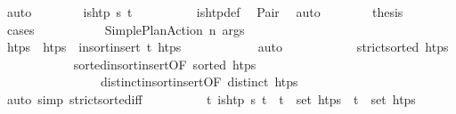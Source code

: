 \begin{isabellebody}
\ auto\isanewline
\ \ \ \ \ \ \isamarkupfalse%
\ {\isachardoublequoteopen}is{\isacharunderscore}{\kern0pt}htp\ {\isacharparenleft}{\kern0pt}{\isasympi}{\isacharhash}{\kern0pt}{\isasympi}s{\isacharparenright}{\kern0pt}\ t\isactrlsub {\isasympi}{\isachardoublequoteclose}\isanewline
\ \ \ \ \ \ \ \ \isamarkupfalse%
\ is{\isacharunderscore}{\kern0pt}htp{\isacharunderscore}{\kern0pt}def\ \isamarkupfalse%
\ Pair\ \isamarkupfalse%
\ auto\isanewline
\ \ \ \ \ \ \isamarkupfalse%
\ {\isacharquery}{\kern0pt}thesis\isanewline
\ \ \ \ \ \ \isamarkupfalse%
\ {\isacharparenleft}{\kern0pt}cases\ {\isasympi}{\isacharprime}{\kern0pt}{\isacharparenright}{\kern0pt}\isanewline
\ \ \ \ \ \ \ \ \isamarkupfalse%
\ {\isacharparenleft}{\kern0pt}Simple{\isacharunderscore}{\kern0pt}Plan{\isacharunderscore}{\kern0pt}Action\ n\ args{\isacharparenright}{\kern0pt}\isanewline
\ \ \ \ \ \ \ \ \isamarkupfalse%
\ \isamarkupfalse%
\ htps\ \ {\isachardoublequoteopen}htps\ {\isacharequal}{\kern0pt}\ insort{\isacharunderscore}{\kern0pt}insert\ t\isactrlsub {\isasympi}\ htps{\isacharprime}{\kern0pt}{\isachardoublequoteclose}\isanewline
\ \ \ \ \ \ \ \ \ \ \isamarkupfalse%
\ auto\isanewline
\ \ \ \ \ \ \ \ \isamarkupfalse%
\ \isamarkupfalse%
\ {\isachardoublequoteopen}strict{\isacharunderscore}{\kern0pt}sorted\ htps{\isachardoublequoteclose}\isanewline
\ \ \ \ \ \ \ \ \ \ \isamarkupfalse%
\ sorted{\isacharunderscore}{\kern0pt}insort{\isacharunderscore}{\kern0pt}insert{\isacharbrackleft}{\kern0pt}OF\ {\isacartoucheopen}sorted\ htps{\isacharprime}{\kern0pt}{\isacartoucheclose}{\isacharbrackright}{\kern0pt}\ \isanewline
\ \ \ \ \ \ \ \ \ \ \ \ \ \ \ \ distinct{\isacharunderscore}{\kern0pt}insort{\isacharunderscore}{\kern0pt}insert{\isacharbrackleft}{\kern0pt}OF\ {\isacartoucheopen}distinct\ htps{\isacharprime}{\kern0pt}{\isacartoucheclose}{\isacharbrackright}{\kern0pt}\isanewline
\ \ \ \ \ \ \ \ \ \ \isamarkupfalse%
\ {\isacharparenleft}{\kern0pt}auto\ simp{\isacharcolon}{\kern0pt}\ strict{\isacharunderscore}{\kern0pt}sorted{\isacharunderscore}{\kern0pt}iff{\isacharparenright}{\kern0pt}\isanewline
\ \ \ \ \ \ \ \ \isamarkupfalse%
\ {\isachardoublequoteopen}{\isasymforall}t{\isachardot}{\kern0pt}\ is{\isacharunderscore}{\kern0pt}htp\ {\isasympi}s\ t\ {\isasymlongrightarrow}\ t\ {\isasymin}\ set\ htps{\isachardoublequoteclose}\ \ {\isachardoublequoteopen}t\isactrlsub {\isasympi}\ {\isasymin}\ set\ htps{\isachardoublequoteclose}\isanewline

\end{isabellebody}
